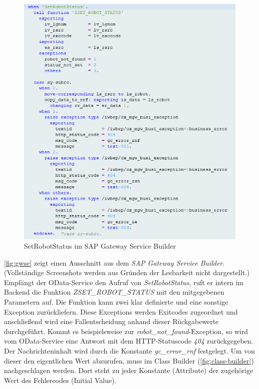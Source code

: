 \begin{figure}[!ht]
	\centering
	\includegraphics[width=\textwidth]{Bilder/ABAP/2020-12-04 10_20_43-Class Builder Class ZCL_ZEWM_ROBCO_DPC_EXT Display_cut.png}
	\caption{SetRobotStatus im SAP Gateway Service Builder}
	\label{fig:gwse}
\end{figure}

\autoref{fig:gwse} zeigt einen Ausschnitt aus dem \emph{SAP Gateway Service Builder}.
(Vollständige Screenshots werden aus Gründen der Lesbarkeit nicht dargestellt.)
Empfängt der OData-Service den Aufruf von \emph{SetRobotStatus}, ruft er intern im Backend die Funktion \emph{ZSET\_ROBOT\_STATUS} mit den mitgegebenen Parametern auf.
Die Funktion kann zwei klar definierte und eine sonstige Exception zurückliefern.
Diese Exceptions werden Exitcodes zugeordnet und anschließend wird eine Fallentscheidung anhand dieser Rückgabewerte durchgeführt.
Kommt es beispielsweise zur \emph{robot\_not\_found}-Exception, so wird vom OData-Service eine Antwort mit dem \ac{HTTP}-Statuscode \emph{404} zurückgegeben.
Der Nachrichteninhalt wird durch die Konstante \emph{gc\_error\_rnf} festgelegt.
Um von dieser den eigentlichen Wert abzurufen, muss im Class Builder (\autoref{fig:class-builder}) nachgeschlagen werden.
Dort steht zu jeder Konstante (Attribute) der zugehörige Wert des Fehlercodes (Initial Value).

